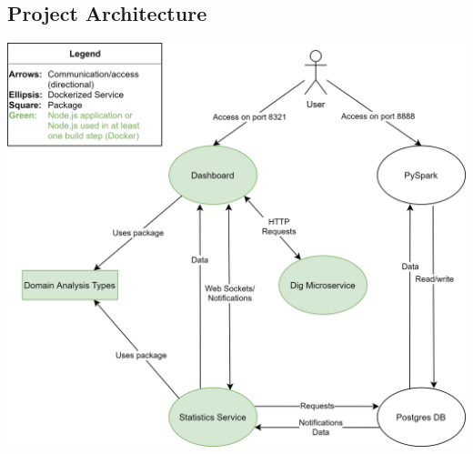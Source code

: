\subsection{Project Architecture}\label{subsec:project-architecture}

\includegraphics[width=1\textwidth]{../project-architecture}
